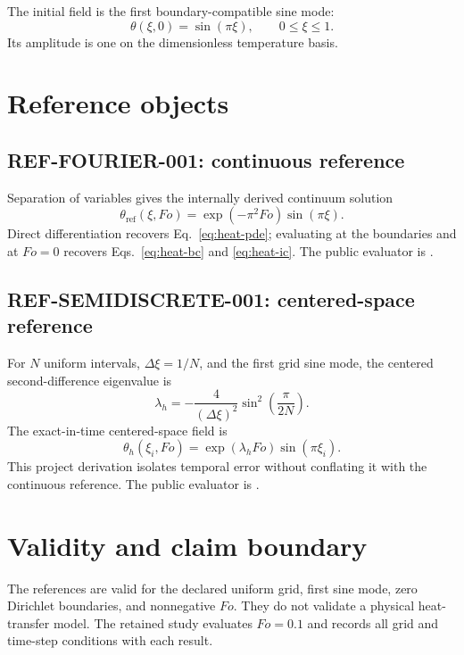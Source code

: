 \documentclass[11pt]{article}
\newcommand{\EqID}[1]{\label{eq:#1}}
\begin{document}
The initial field is the first boundary-compatible sine mode:
\begin{equation}
  \theta(\xi,0)=\sin(\pi\xi),
  \qquad 0\leq\xi\leq1.
  \EqID{heat-ic}
\end{equation}
Its amplitude is one on the dimensionless temperature basis.

\section{Reference objects}

\subsection{REF-FOURIER-001: continuous reference}

Separation of variables gives the internally derived continuum solution
\begin{equation}
  \theta_{\mathrm{ref}}(\xi,Fo)
  =\exp(-\pi^2 Fo)\sin(\pi\xi).
  \EqID{heat-exact}
\end{equation}
Direct differentiation recovers Eq.~\eqref{eq:heat-pde}; evaluating at the
boundaries and at \(Fo=0\) recovers Eqs.~\eqref{eq:heat-bc} and
\eqref{eq:heat-ic}. The public evaluator is
.

\subsection{REF-SEMIDISCRETE-001: centered-space reference}

For \(N\) uniform intervals, \(\Delta\xi=1/N\), and the first grid sine mode,
the centered second-difference eigenvalue is
\begin{equation}
  \lambda_h
  =-\frac{4}{(\Delta\xi)^2}
    \sin^2\!\left(\frac{\pi}{2N}\right).
  \EqID{semidiscrete-eigenvalue}
\end{equation}
The exact-in-time centered-space field is
\begin{equation}
  \theta_h(\xi_i,Fo)
  =\exp(\lambda_h Fo)\sin(\pi\xi_i).
  \EqID{semidiscrete-reference}
\end{equation}
This project derivation isolates temporal error without conflating it with the
continuous reference. The public evaluator is
.

\section{Validity and claim boundary}

The references are valid for the declared uniform grid, first sine mode, zero
Dirichlet boundaries, and nonnegative \(Fo\). They do not validate a physical
heat-transfer model. The retained study evaluates \(Fo=0.1\) and records all
grid and time-step conditions with each result.
\end{document}
